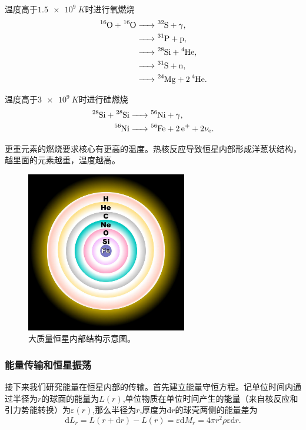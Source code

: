 \documentclass[../天体物理基础.tex]{subfiles}
\begin{document}
温度高于$\qty{1.5e9}{K}$时进行氧燃烧
\begin{align}
\ce{^{16}O +^{16}O &->^{32}S}+\gamma,\notag\\
\ce{&->^{31}P +p},\notag\\
\ce{&->^{28}Si +^{4}He},\notag\\
\ce{&->^{31}S +n},\notag\\
\ce{&->^{24}Mg +2^{4}He}.
\end{align}

温度高于$\qty{3e9}{K}$时进行硅燃烧
\begin{align}
\ce{^{28}Si +^{28}Si &->^{56}Ni}+\gamma,\notag\\
\ce{^{56}Ni &->^{56}Fe +2e+}+2\nu_{\ce{e}}.\notag
\end{align}

更重元素的燃烧要求核心有更高的温度。热核反应导致恒星内部形成洋葱状结构，越里面的元素越重，温度越高。
\begin{figure}[!htbp]
\centering
\includegraphics[width=7cm]{figures/figure2_2.JPG}
\captionsetup{justification=raggedright, singlelinecheck=false}
\caption{大质量恒星内部结构示意图。}
\label{大质量恒星内部结构示意图。}
\end{figure}

\subsubsection{能量传输和恒星振荡}
接下来我们研究能量在恒星内部的传输。首先建立能量守恒方程。记单位时间内通过半径为$r$的球面的能量为$L\left(r\right)$,单位物质在单位时间产生的能量（来自核反应和引力势能转换）为$\varepsilon\left(r\right)$,那么半径为$r$,厚度为$\mathrm{d}r$的球壳两侧的能量差为
\begin{equation}
\mathrm{d}L_{r}=L\left(r+\mathrm{d}r\right)-L\left(r\right)=\varepsilon\mathrm{d}M_{r}=4\pi{}r^{2}\rho\varepsilon\mathrm{d}r.
\end{equation}
\end{document}
